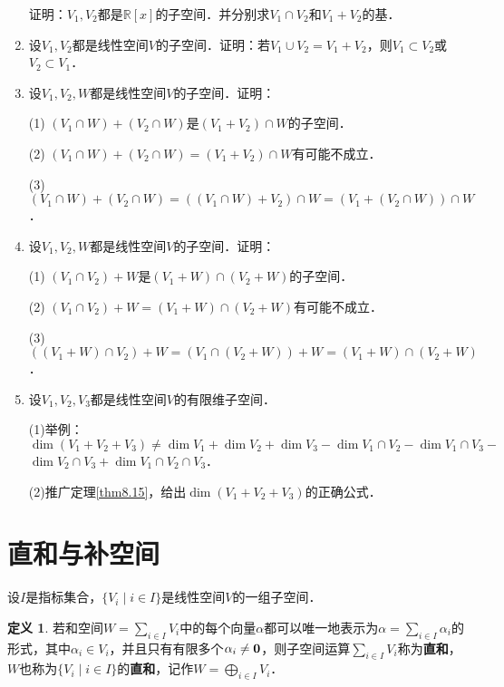 \documentclass[a4paper,fontset=windows]{ctexbook}
\theoremstyle{definition}
\newtheorem{definition}{定义}[chapter]
\begin{document}
\begin{enumerate}
证明：$V_1,V_2$都是$\mathbb{R}[x]$的子空间．并分别求$V_1\cap V_2$和$V_1+V_2$的基．

\item 设$V_1,V_2$都是线性空间$V$的子空间．证明：若$V_1\cup V_2=V_1+V_2$，则$V_1\subset V_2$或$V_2\subset V_1$．

\item 设$V_1,V_2,W$都是线性空间$V$的子空间．证明：

(1) $(V_1\cap W)+(V_2\cap W)$是$(V_1+V_2)\cap W$的子空间．

(2) $(V_1\cap W)+(V_2\cap W)=(V_1+V_2)\cap W$有可能不成立．

(3) $(V_1\cap W)+(V_2\cap W)=((V_1\cap W)+V_2)\cap W=(V_1+(V_2\cap W))\cap W$．

\item 设$V_1,V_2,W$都是线性空间$V$的子空间．证明：

(1) $(V_1\cap V_2)+W$是$(V_1+W)\cap(V_2+W)$的子空间．

(2) $(V_1\cap V_2)+W=(V_1+W)\cap(V_2+W)$有可能不成立．

(3) $((V_1+W)\cap V_2)+W=(V_1\cap(V_2+W))+W=(V_1+W)\cap(V_2+W)$．

\item 设$V_1,V_2,V_3$都是线性空间$V$的有限维子空间．

(1)举例：$\dim(V_1+V_2+V_3)\ne\dim V_1+\dim V_2+\dim V_3-\dim V_1\cap V_2-\dim V_1\cap V_3-$ \\ \hspace*{18pt}$\dim V_2\cap V_3+\dim V_1\cap V_2\cap V_3$．

(2)推广定理\ref{thm8.15}，给出$\dim(V_1+V_2+V_3)$的正确公式．

\end{enumerate}

\clearpage\section{直和与补空间}

设$I$是指标集合，$\{V_i\mid i\in I\}$是线性空间$V$的一组子空间．

\begin{definition}
若和空间$W=\sum\limits_{i\in I}V_i$中的每个向量$\alpha$都可以唯一地表示为$\alpha=\sum\limits_{i\in I}\alpha_i$的形式，其中$\alpha_i\in V_i$，并且只有有限多个$\alpha_i\ne{\bf 0}$，则子空间运算$\sum\limits_{i\in I}V_i$称为{\bf 直和}，$W$也称为$\{V_i\mid i\in I\}$的{\bf 直和}，记作$W=\bigoplus\limits_{i\in I}V_i$．
\end{definition}
\end{document}
